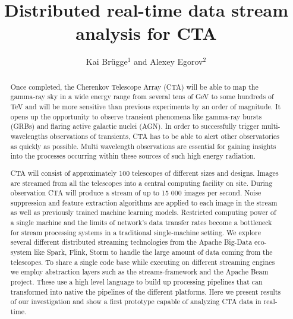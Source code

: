 \documentclass[11pt,twoside]{article}
\begin{document}
\title{Distributed real-time data stream analysis for CTA}

\author{Kai Br\"ugge$^1$  and Alexey Egorov$^2$}



\begin{abstract}

  Once completed, the  Cherenkov Telescope Array (CTA)  will be able to map the gamma-ray sky in a wide energy range from several tens of GeV to some hundreds of TeV and will be more sensitive than previous experiments by an order of magnitude.
  It opens up the opportunity to observe transient phenomena like gamma-ray bursts (GRBs) and flaring active galactic nuclei (AGN).  In order to successfully trigger multi-wavelengths observations of transients, CTA has to be able to alert other observatories as quickly as possible.  Multi wavelength observations are essential for gaining insights into the processes occurring within these sources of such high energy radiation.

  CTA will consist of approximately 100 telescopes of different sizes and designs.
  Images are streamed from all the telescopes into a central computing facility on site.
  During observation CTA will produce a stream of up to 15 000 images per second. Noise suppression and feature extraction algorithms are applied to each image in the stream as well as previously trained machine learning models.
  Restricted computing power of a single machine and the limits of network's data transfer rates become a bottleneck for stream processing systems in a traditional single-machine setting.
  We explore several different distributed streaming technologies from the Apache Big-Data eco-system like Spark, Flink, Storm to handle the large amount of data coming from the telescopes.
  To share a single code base while executing on different streaming engines we employ  abstraction layers such as the streams-framework and the Apache Beam project.
  These use  a high level language to build up processing pipelines that can transformed into native the pipelines of the different platforms.
  Here we present results of our investigation and show a first prototype capable of analyzing CTA data in real-time.

\end{abstract}
\end{document}
